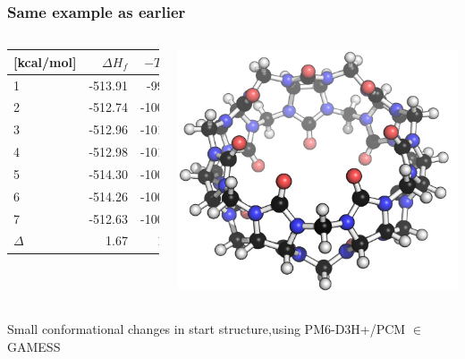 \begin{frame}[fragile]
    \frametitle{Same example as earlier}

    \begin{columns}[t]

        \centering

        \begin{tabular}{@{} l r r r @{} }

            [kcal/mol] & $\Delta H_f$ & $-T\Delta S$ & $N_i$ \\

          \midrule

          1 & -513.91 & -99.50 & 0 \\
          2 & -512.74 & -100.68 & 0 \\
          3 & -512.96 & -101.33 & 0 \\
          4 & -512.98 & -101.23 & 0 \\
          5 & -514.30 & -100.07 & 0 \\
          6 & -514.26 & -100.34 & 0 \\
          7 & -512.63 & -100.67 & 0 \\

          \midrule

          $\Delta$ & 1.67 & 1.83 


        \end{tabular}


        \centering

        \includegraphics[width=0.9\linewidth]{images/cb7-a.png}

    \end{columns}

    \bigskip
    \small
    Small conformational changes in start structure,\newline using PM6-D3H+/PCM $\in$ GAMESS

\end{frame}



